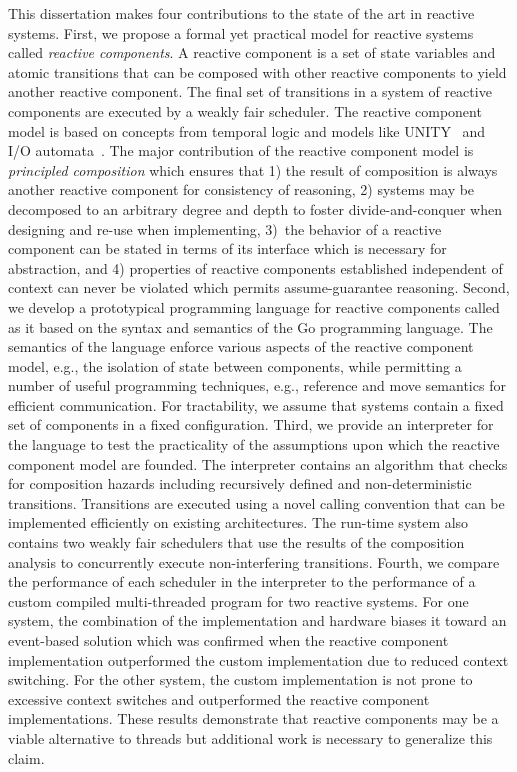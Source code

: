 This dissertation makes four contributions to the state of the art in reactive systems.
First, we propose a formal yet practical model for reactive systems called \emph{reactive components}.
A reactive component is a set of state variables and atomic transitions that can be composed with other reactive components to yield another reactive component.
The final set of transitions in a system of reactive components are executed by a weakly fair scheduler.
The reactive component model is based on concepts from temporal logic and models like UNITY~\cite{chandy1989parallel} and I/O automata~\cite{nancy1996distributed}.
The major contribution of the reactive component model is \emph{principled composition} which ensures that 1) the result of composition is always another reactive component for consistency of reasoning, 2) systems may be decomposed to an arbitrary degree and depth to foster divide-and-conquer when designing and re-use when implementing, 3)~the behavior of a reactive component can be stated in terms of its interface which is necessary for abstraction, and 4) properties of reactive components established independent of context can never be violated which permits assume-guarantee reasoning.
Second, we develop a prototypical programming language for reactive components called \rcgo as it based on the syntax and semantics of the Go programming language.
The semantics of the language enforce various aspects of the reactive component model, e.g., the isolation of state between components, while permitting a number of useful programming techniques, e.g., reference and move semantics for efficient communication.
For tractability, we assume that systems contain a fixed set of components in a fixed configuration.
Third, we provide an interpreter for the \rcgo language to test the practicality of the assumptions upon which the reactive component model are founded.
The interpreter contains an algorithm that checks for composition hazards including recursively defined and non-deterministic transitions.
Transitions are executed using a novel calling convention that can be implemented efficiently on existing architectures.
The run-time system also contains two weakly fair schedulers that use the results of the composition analysis to concurrently execute non-interfering transitions.
Fourth, we compare the performance of each scheduler in the interpreter to the performance of a custom compiled multi-threaded program for two reactive systems.
For one system, the combination of the implementation and hardware biases it toward an event-based solution which was confirmed when the reactive component implementation outperformed the custom implementation due to reduced context switching.
For the other system, the custom implementation is not prone to excessive context switches and outperformed the reactive component implementations.
These results demonstrate that reactive components may be a viable alternative to threads but additional work is necessary to generalize this claim.
